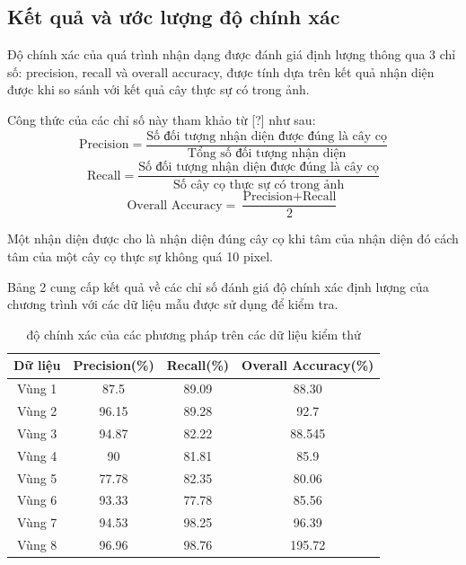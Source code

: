 \documentclass[14pt, oneside, a4paper, openany]{scrartcl}
\begin{document}
\subsection{Kết quả và ước lượng độ chính xác}
Độ chính xác của quá trình nhận dạng được đánh giá định lượng thông qua 3 chỉ số: precision, recall và overall accuracy, được tính dựa trên kết quả nhận diện được khi so sánh với kết quả cây thực sự có trong ảnh.

Công thức của các chỉ số này tham khảo từ [?] như sau:
\begin{equation}
	\text{Precision} = \frac{\text{Số đối tượng nhận diện được đúng là cây cọ}}{\text{Tổng số đối tượng nhận diện}}
\end{equation}
\begin{equation}
	\text{Recall} = \frac{\text{Số đối tượng nhận diện được đúng là cây cọ}}{\text{Số cây cọ thực sự có trong ảnh}}
\end{equation}
\begin{equation}
	\text{Overall Accuracy} = \frac{\text{Precision} + \text{Recall}}{2}
\end{equation}

Một nhận diện được cho là nhận diện đúng cây cọ khi tâm của nhận diện đó cách tâm của một cây cọ thực sự không quá 10 pixel.

Bảng 2 cung cấp kết quả về các chỉ số đánh giá độ chính xác định lượng của chương trình với các dữ liệu mẫu được sử dụng để kiểm tra.

\begin{table}[!h]
	\caption[độ chính xác của các phương pháp trên các dữ liệu kiểm thử]{độ chính xác của các phương pháp trên các dữ liệu kiểm thử}
	\centering
	\begin{tabular}{ |c|c|c|c| } 
		\hline
		Dữ liệu & Precision(\%) & Recall(\%) & Overall Accuracy(\%)\\ 
		\hline
		Vùng 1 & 87.5 & 89.09 & 88.30\\
		Vùng 2 & 96.15 & 89.28 & 92.7\\ 
		Vùng 3 & 94.87 & 82.22 & 88.545\\ 
		Vùng 4 & 90 & 81.81 & 85.9\\ 
		Vùng 5 & 77.78 & 82.35 & 80.06\\ 
		Vùng 6 & 93.33 & 77.78 & 85.56\\ 
		Vùng 7 & 94.53 & 98.25 & 96.39\\ 
		Vùng 8 & 96.96 & 98.76 & 195.72\\ 
		\hline
	\end{tabular}
\end{table}
\end{document}
